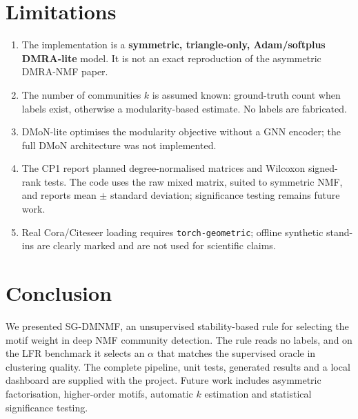 \documentclass[11pt,a4paper]{article}
\begin{document}
\section{Limitations}
\begin{enumerate}
\item The implementation is a \textbf{symmetric, triangle-only, Adam/softplus DMRA-lite}
      model. It is not an exact reproduction of the asymmetric DMRA-NMF paper.
\item The number of communities $k$ is assumed known: ground-truth count when labels exist,
      otherwise a modularity-based estimate. No labels are fabricated.
\item DMoN-lite optimises the modularity objective without a GNN encoder; the full DMoN
      architecture was not implemented.
\item The CP1 report planned degree-normalised matrices and Wilcoxon signed-rank tests.
      The code uses the raw mixed matrix, suited to symmetric NMF, and reports mean $\pm$
      standard deviation; significance testing remains future work.
\item Real Cora/Citeseer loading requires \texttt{torch-geometric}; offline synthetic
      stand-ins are clearly marked and are not used for scientific claims.
\end{enumerate}

\section{Conclusion}
We presented SG-DMNMF, an unsupervised stability-based rule for selecting the motif weight
in deep NMF community detection. The rule reads no labels, and on the LFR benchmark it
selects an $\alpha$ that matches the supervised oracle in clustering quality. The complete
pipeline, unit tests, generated results and a local dashboard are supplied with the project.
Future work includes asymmetric factorisation, higher-order motifs, automatic $k$ estimation
and statistical significance testing.
\end{document}
